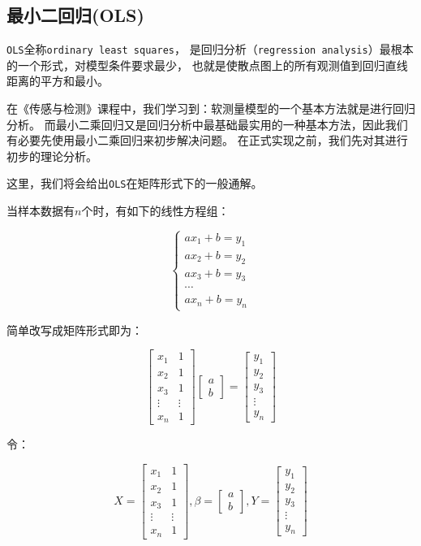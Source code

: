 \documentclass[11pt,a4paper]{elegantpaper}
\begin{document}
\begin{multicols}{2}
\subsection{最小二回归(OLS)}

\lstinline{OLS}全称\lstinline{ordinary least squares}，
是回归分析（\lstinline{regression analysis}）最根本的一个形式，对模型条件要求最少，
也就是使散点图上的所有观测值到回归直线距离的平方和最小。

在《传感与检测》课程中，我们学习到：软测量模型的一个基本方法就是进行回归分析。
而最小二乘回归又是回归分析中最基础最实用的一种基本方法，因此我们有必要先使用最小二乘回归来初步解决问题。
在正式实现之前，我们先对其进行初步的理论分析。

这里，我们将会给出\lstinline{OLS}在矩阵形式下的一般通解。

当样本数据有$n$个时，有如下的线性方程组：

$$
\left\{\begin{array}{l}
a x_{1}+b=y_{1} \\
a x_{2}+b=y_{2} \\
a x_{3}+b=y_{3} \\
\cdots \\
a x_{n}+b=y_{n}
\end{array}\right.
$$

简单改写成矩阵形式即为：

$$
\left[\begin{array}{cc}
x_{1} & 1 \\
x_{2} & 1 \\
x_{3} & 1 \\
\vdots & \vdots \\
x_{n} & 1
\end{array}\right]\left[\begin{array}{l}
a \\
b
\end{array}\right]=\left[\begin{array}{c}
y_{1} \\
y_{2} \\
y_{3} \\
\vdots \\
y_{n}
\end{array}\right]
$$

令：

$$
X=\left[\begin{array}{cc}
x_{1} & 1 \\
x_{2} & 1 \\
x_{3} & 1 \\
\vdots & \vdots \\
x_{n} & 1
\end{array}\right], \beta=\left[\begin{array}{c}
a \\
b
\end{array}\right], Y=\left[\begin{array}{c}
y_{1} \\
y_{2} \\
y_{3} \\
\vdots \\
y_{n}
\end{array}\right]
$$


\end{multicols}
\end{document}
